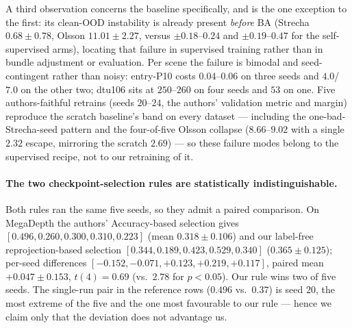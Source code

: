 \documentclass[10pt,twocolumn,letterpaper]{article}
\begin{document}
A third observation concerns the baseline specifically, and is the one exception to the
first: its clean-OOD instability is already present \emph{before} BA (Strecha
$0.68\pm0.78$, Olsson $11.01\pm2.27$, versus $\pm0.18$--$0.24$ and $\pm0.19$--$0.47$ for
the self-supervised arms), locating that failure in supervised training rather than in
bundle adjustment or evaluation. Per scene the failure is bimodal and seed-contingent
rather than noisy: entry-P10 costs $0.04$--$0.06$ on three seeds and $4.0$/$7.0$ on the
other two; dtu106 sits at $250$--$260$ on four seeds and $53$ on one. Five
authors-faithful retrains (seeds $20$--$24$, the authors' validation metric and margin)
reproduce the scratch baseline's band on every dataset --- including the
one-bad-Strecha-seed pattern and the four-of-five Olsson collapse ($8.66$--$9.02$ with a
single $2.32$ escape, mirroring the scratch $2.69$) --- so these failure modes belong to
the supervised recipe,  not to our retraining of it.

\paragraph{The two checkpoint-selection rules are statistically indistinguishable.}
Both rules ran the same five seeds, so they admit a paired comparison. On MegaDepth the
authors' Accuracy-based selection gives $[0.496, 0.260, 0.300, 0.310, 0.223]$ (mean
$0.318\pm0.106$) and our label-free reprojection-based selection $[0.344, 0.189, 0.423,
0.529, 0.340]$ ($0.365\pm0.125$); per-seed differences $[-0.152, -0.071, +0.123,
+0.219, +0.117]$, paired mean $+0.047\pm0.153$, $t(4)=0.69$ (vs.\ $2.78$ for
$p<0.05$). Our rule wins two of five seeds. The single-run pair in the reference rows
($0.496$ vs.\ $0.37$) is seed $20$, the most extreme of the five and the one most
favourable to our rule --- hence we claim only that the deviation does not advantage
us.
\end{document}

